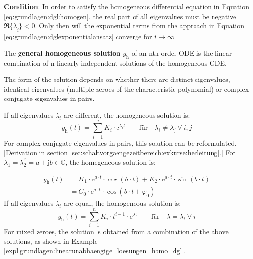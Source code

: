 \begin{frame}
{    %
    \textbf{Condition:} In order to satisfy the homogeneous differential equation in Equation \ref{eq:grundlagen:dgl:homogen},
    the real part of all eigenvalues must be negative $\Re\{\underline{\lambda}_i\}<0$.
    Only then will the exponential terms from the approach in Equation \ref{eq:grundlagen:dglexponentialansatz}
    converge for $t \to \infty$.

    The \textbf{general homogeneous solution} $y_{\mathrm{h}}$ of an nth-order ODE is the linear combination
    of n linearly independent solutions of the homogeneous ODE.

    The form of the solution depends on whether there are distinct eigenvalues, identical eigenvalues (multiple zeroes of the characteristic polynomial) 
    or complex conjugate eigenvalues in pairs.

    If all eigenvalues $\lambda_i$ are different, the homogeneous solution is:
    \begin{equation}\label{eq:grundlagen:homogeneloesung:lambdaungleich}
        y_{\mathrm{h}}(t) = \sum_{i=1}^{n} K_i \cdot \mathrm{e}^{\lambda_i t} \qquad \text{für} \quad \lambda_i \neq \lambda_j \ \forall \ i,j
    \end{equation}
    For complex conjugate eigenvalues in pairs, this solution can be reformulated. [Derivation in section \ref{sec:schaltvorgaengezeitbereich:exkurse:herleitung}.]
    For $\lambda_1 = \lambda_2^* = a + \mathrm{j} b \in \mathbb{C}$, the homogeneous solution is:    
    
    \begin{equation}\label{eq:grundlagen:homogeneloesung:lambdakomplex}
        \begin{aligned}
        y_{\mathrm{h}}(t) &= K_1 \cdot \mathrm{e}^{a \cdot t} \cdot \cos(b \cdot t) + K_2 \cdot \mathrm{e}^{a \cdot t} \cdot \sin(b \cdot t) \\
        &= C_0 \cdot \mathrm{e}^{a \cdot t} \cdot \cos(b \cdot t + \varphi_0)
        \end{aligned}
    \end{equation}
    If all eigenvalues $\lambda_i$ are equal, the homogeneous solution is:
    \begin{equation}\label{eq:grundlagen:homogeneloesung:lambdagleich}
        y_{\mathrm{h}}(t) = \sum_{i=1}^{n} K_i \cdot t^{i-1}  \cdot \mathrm{e}^{\lambda t} \qquad \text{für} \quad \lambda = \lambda_i \ \forall \ i
    \end{equation}
    For mixed zeroes, the solution is obtained from a combination of the above solutions, as shown in
    Example \ref{expl:grundlagen:linearunabhaengige_loesungen_homo_dgl}.

}
\end{frame}
